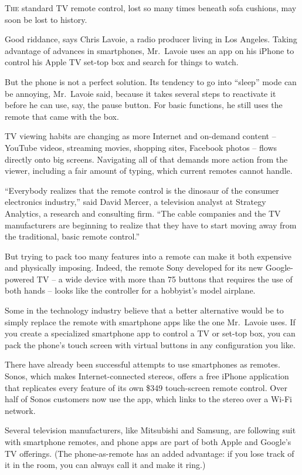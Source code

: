 ﻿\documentclass[12pt]{article}
\begin{document}
\lettrine{T}{he} standard TV remote control, lost so many times beneath sofa
cushions, may soon be lost to history.

Good riddance, says Chris Lavoie, a radio producer living in Los Angeles. Taking advantage of
advances in smartphones, Mr.~Lavoie uses an app on his iPhone to control his Apple TV set-top box
and search for things to watch.

But the phone is not a perfect solution. Its tendency to go into ``sleep'' mode can be annoying,
Mr.~Lavoie said, because it takes several steps to reactivate it before he can use, say, the pause
button. For basic functions, he still uses the remote that came with the box.

TV viewing habits are changing as more Internet and on-demand content -- YouTube videos, streaming
movies, shopping sites, Facebook photos -- flows directly onto big screens. Navigating all of that
demands more action from the viewer, including a fair amount of typing, which current remotes cannot
handle.

``Everybody realizes that the remote control is the dinosaur of the consumer electronics industry,''
said David Mercer, a television analyst at Strategy Analytics, a research and consulting firm. ``The
cable companies and the TV manufacturers are beginning to realize that they have to start moving
away from the traditional, basic remote control.''

But trying to pack too many features into a remote can make it both expensive and physically
imposing. Indeed, the remote Sony developed for its new Google-powered TV -- a wide device with more
than 75 buttons that requires the use of both hands -- looks like the controller for a hobbyist's
model airplane.

Some in the technology industry believe that a better alternative would be to simply replace the
remote with smartphone apps like the one Mr.~Lavoie uses. If you create a specialized smartphone app
to control a TV or set-top box, you can pack the phone's touch screen with virtual buttons in any
configuration you like.

There have already been successful attempts to use smartphones as remotes. Sonos, which makes
Internet-connected stereos, offers a free iPhone application that replicates every feature of its
own \$349 touch-screen remote control. Over half of Sonos customers now use the app, which links to
the stereo over a Wi-Fi network.

Several television manufacturers, like Mitsubishi and Samsung, are following suit with smartphone
remotes, and phone apps are part of both Apple and Google's TV offerings. (The phone-as-remote has
an added advantage: if you lose track of it in the room, you can always call it and make it ring.)
\end{document}
